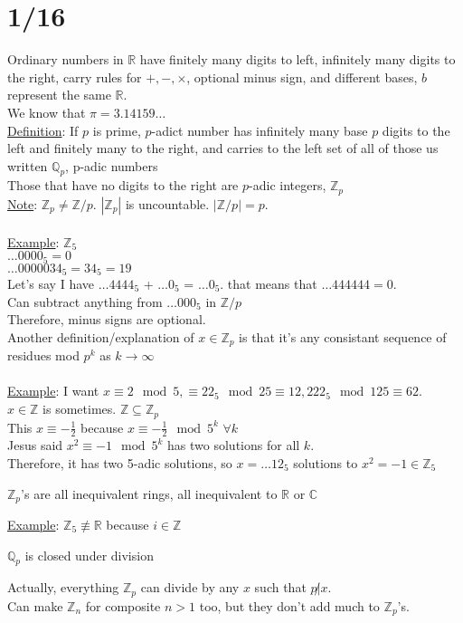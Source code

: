 \section*{1/16}
  Ordinary numbers in $\mathbb{R}$ have finitely many digits to left,
  infinitely many digits to the right, carry rules for $+, -, \times$,
  optional minus sign, and different bases, $b$ represent the same 
  $\mathbb{R}$.\\
  We know that $\pi = 3.14159 \ldots$\\
  \underline{Definition}: If $p$ is prime, $p$-adict number has infinitely
  many base $p$ digits to the left and finitely many to the right, and carries
  to the left set of all of those us written $\mathbb{Q}_p$, p-adic numbers\\
  Those that have no digits to the right are $p$-adic integers, 
  $\mathbb{Z}_p$\\
  \underline{Note}: $\mathbb{Z}_p \not= \mathbb{Z}/p$. $|\mathbb{Z}_p|$ is
  uncountable. $|\mathbb{Z}/p| = p$.\\\\
  \underline{Example}: $\mathbb{Z}_5$\\
  $\ldots0000_5 = 0$\\
  $\ldots0000034_5 = 34_5  = 19$\\
  Let's say I have $\ldots4444_5$ + $\ldots 0_5$ = $\ldots 0_5$. that means
  that $\ldots444444 = 0$.\\
  Can subtract anything from $\ldots000_5$ in $\mathbb{Z}/p$\\
  Therefore, minus signs are optional.\\
  Another definition/explanation of $x \in \mathbb{Z}_p$ is that it's
  any consistant sequence of residues mod $p^k$ as $k \to \infty$\\\\
  \underline{Example}: I want $x \equiv 2 \mod 5, \equiv 22_5 \mod 25 \equiv 
  12, 222_5 \mod 125 \equiv 62$.\\
  $x \in \mathbb{Z}$ is sometimes. $\mathbb{Z} \subseteq \mathbb{Z}_p$\\
  This $x \equiv -\frac{1}{2}$ because $x \equiv -\frac{1}{2} \mod 5^k$
  $\forall k$\\
  Jesus said $x^2 \equiv -1 \mod 5^k$ has two solutions for all $k$.\\
  Therefore, it has two 5-adic solutions, so $x = \ldots 12_5$ solutions
  to $x^2 = -1 \in \mathbb{Z}_5$\\
  \begin{theorem}
    $\mathbb{Z}_p$'s are all inequivalent rings, all inequivalent to 
    $\mathbb{R}$ or $\mathbb{C}$
  \end{theorem}
  \underline{Example}: $\mathbb{Z}_5 \not\equiv \mathbb{R}$ because $i \in
    \mathbb{Z}$
  \begin{theorem}
    $\mathbb{Q}_p$ is closed under division
  \end{theorem}
  Actually, everything $\mathbb{Z}_p$ can divide by any $x$ such that $p 
  \not| x$.\\
  Can make $\mathbb{Z}_n$ for composite $n > 1$ too, but they don't add much
  to $\mathbb{Z}_p$'s.
